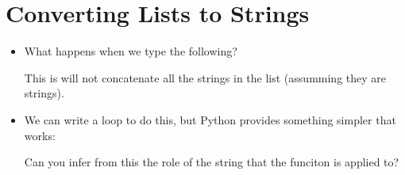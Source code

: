 \documentclass[letterpaper,10pt,english]{sphinxmanual}
\begin{document}
\section{Converting Lists to Strings}
\label{\detokenize{lecture_notes/lec10_lists2:converting-lists-to-strings}}\begin{itemize}
\item {} 
What happens when we type the following?

%
\begin{sphinxVerbatim}[commandchars=\\\{\}]
  
  
  
\end{sphinxVerbatim}

This is will not concatenate all the strings in the list (assumming they are
strings).

\item {} 
We can write a  loop to do this, but Python provides
something simpler that works:

%
\begin{sphinxVerbatim}[commandchars=\\\{\}]
  \PYG{p}{[}       \PYG{p}{]}
\end{sphinxVerbatim}

Can you infer from this the role of the string that the  funciton
is applied to?

\end{itemize}
\end{document}
